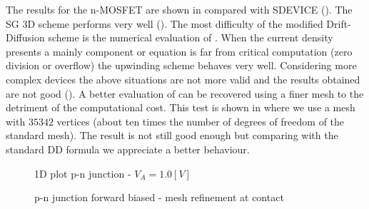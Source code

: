 The results for the n-MOSFET are shown in  compared with SDEVICE (). The SG 3D scheme performs very well (). The most difficulty of the modified Drift-Diffusion scheme is the numerical evaluation of . When the current density presents a mainly component or equation  is far from critical computation (zero division or overflow) the upwinding scheme behaves very well. Considering more complex devices the above situations are not more valid and the results obtained are not good (). A better evaluation of  can be recovered using a finer mesh to the detriment of the computational cost. This test is shown in  where we use a mesh with $35342$ vertices (about ten times the number of degrees of freedom of the standard mesh). The result is not still good enough but comparing with the standard DD formula  we appreciate a better behaviour.
  
\begin{figure}[!h]
\centering






\caption{1D plot p-n junction - $V_A=1.0[V]$ }
\label{fig: pn current density 1V}
\end{figure}


\begin{figure}[!h]
\centering
{}
\vspace{1cm}

\caption{p-n junction forward biased - mesh refinement at contact}
\label{fig: pn junct mesh refinement}
\end{figure} 



